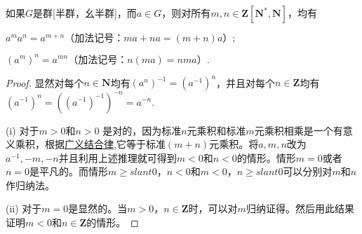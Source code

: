 \documentclass[../../main.tex]{subfiles}
\begin{document}
\begin{theorem}
如果$G$是群[半群，幺半群]，而$a \in G$，则对所有$m, n \in \boldsymbol{Z}[\boldsymbol{N}^*, \boldsymbol{N}]$，均有

 $ a^m a^n = a^{m + n} \text{（加法记号：} ma + na = (m + n)a\text{）}; $

 $ (a^m)^n = a^{mn} \text{（加法记号：} n(ma) = nma\text{）}.$
\end{theorem}
\begin{proof}
显然对每个$n \in \boldsymbol{N}$均有$(a^n)^{-1} = (a^{-1})^n$，并且对每个$n \in \boldsymbol{Z}$均有$(a^{-1})^n=((a^{-1})^{-1})^{-n}=a^{-n}$.

(i) 对于$m > 0$和$n > 0$ 是对的，因为标准$n$元乘积和标准$m$元乘积相乘是一个有意义乘积，根据\hyperref[theorem:广义结合律]{广义结合律},它等于标准$(m + n)$元乘积。将$a, m, n$改为$a^{-1}, -m, -n$并且利用上述推理就可得到$m < 0$和$n < 0$的情形。情形$m = 0$或者$n = 0$是平凡的。而情形$m \geqslant slant 0$，$n < 0$和$m < 0$，$n \geqslant slant 0$可以分别对$m$和$n$作归纳法。

(ii) 对于$m = 0$是显然的。当$m > 0$，$n \in \boldsymbol{Z}$时，可以对$m$归纳证得。然后用此结果证明$m < 0$和$n \in \boldsymbol{Z}$的情形。
\end{proof}
\end{document}
